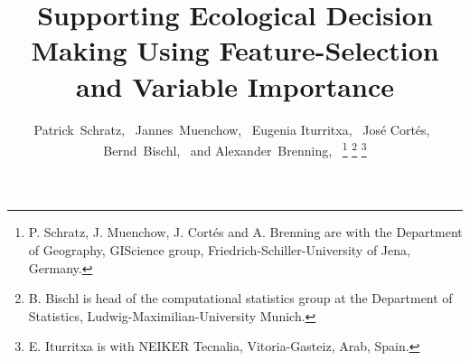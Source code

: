 \documentclass[letterpaper, peerreview]{IEEEtran}
\begin{document}
%
\title{Supporting Ecological Decision Making Using Feature-Selection and Variable Importance}
%
%
%


\author{Patrick~Schratz,~
	Jannes~Muenchow,~
	Eugenia Iturritxa,~
	José Cortés,~
	Bernd~Bischl,~
	and Alexander~Brenning,~
	\thanks{P. Schratz, J. Muenchow, J. Cortés and A. Brenning are with the Department
		of Geography, GIScience group, Friedrich-Schiller-University of Jena, Germany.}%
	\thanks{B. Bischl is head of the computational statistics group at the Department of Statistics, Ludwig-Maximilian-University Munich.}%
	\thanks{E. Iturritxa is with NEIKER Tecnalia, Vitoria-Gasteiz, Arab, Spain.}%
}

%
%
\end{document}
